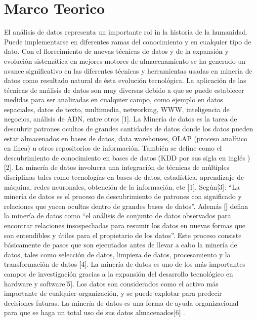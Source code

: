 \section{Marco Teorico}
El análisis de datos representa un importante rol in la historia de la humanidad. Puede implementarse en diferentes ramas del conocimiento y en cualquier tipo de dato. Con el florecimiento de nuevas técnicas de datos y de la expansión y evolución sistemática en mejores motores de almacenamiento se ha generado un avance significativo en las diferentes técnicas y herramientas usadas en minería de datos como resultado natural de ésta  evolución tecnológica. La aplicación de las técnicas de análisis de datos son muy diversas debido a que se puede establecer medidas para ser analizadas en cualquier campo, como ejemplo en datos espaciales, datos de texto, multimedia, networking, WWW, inteligencia de negocios, análisis de ADN, entre otros [1].
La Minería de datos es la tarea de descubrir patrones ocultos de grandes cantidades de datos donde los datos pueden estar almacenados en bases de datos, data warehouses, OLAP (proceso analítico en línea) u otros repositorios de información. También se define como el descubrimiento de conocimiento en bases de datos (KDD por sus sigla en inglés ) [2]. 
La minería de datos involucra una integración de técnicas de múltiples disciplinas tales como tecnologías en bases de datos, estadística, aprendizaje de máquina, redes neuronales, obtención de la información, etc [1].
Según[3]: “La minería de datos es el proceso de descubrimiento de patrones con significado y relaciones que yacen ocultas dentro de grandes bases de datos”. Además [] defina la minería de datos como “el análisis de conjunto de datos observados para encontrar relaciones insospechadas para resumir los datos en nuevas formas que son entendibles y útiles para el propietario de los datos”.
Este proceso consiste básicamente de pasos que son ejecutados antes de llevar a cabo la minería de datos, tales como selección de datos, limpieza de datos, procesamiento y la transformación de datos [4].
La minería de datos es uno de los más importantes campos de investigación gracias a la expansión del desarrollo tecnológico en hardware y software[5]. Los datos son considerados como el activo más importante de cualquier organización, y se puede explotar para predecir decisiones futuras. La minería de datos es una forma de ayuda organizacional para que se haga un total uso de sus datos almacenados[6] .

